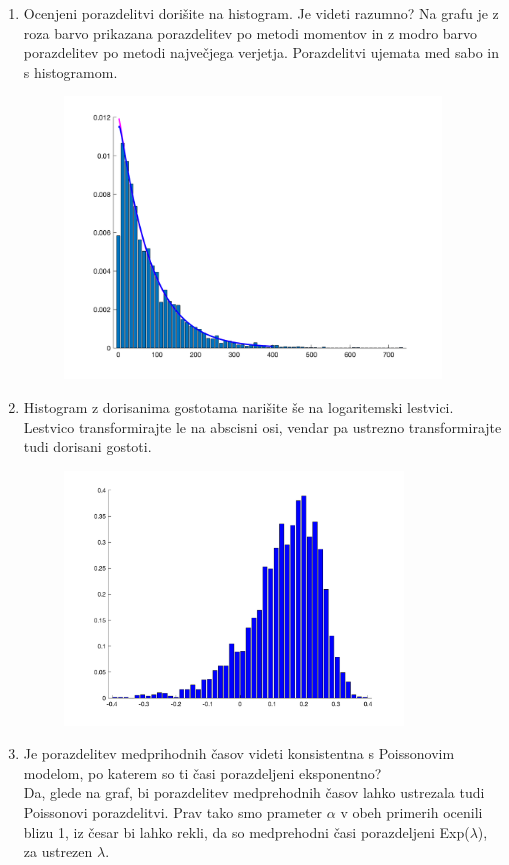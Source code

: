 \documentclass[a4paper]{article}
\begin{document}
\begin{enumerate}[label=(\alph*)]
\item Ocenjeni porazdelitvi dorišite na histogram. Je videti razumno?
Na grafu je z roza barvo prikazana porazdelitev po metodi momentov in z modro barvo porazdelitev po metodi največjega verjetja. Porazdelitvi ujemata med sabo in s histogramom.
\begin{figure}[h!]
\centering
\includegraphics[width=10cm]{histogram_porazdelitve3.png}
\label{Histogram prehodnih časov z ocenjenima porazdelitvama}
\end{figure}

\item Histogram z dorisanima gostotama narišite še na logaritemski lestvici. Lestvico transformirajte le na abscisni osi, vendar pa ustrezno transformirajte tudi dorisani gostoti.

\begin{figure}[h!]
\centering
\includegraphics[width=9cm]{log_histogram3.png}
\label{Histogram prehodnih časov na logaritemski lestvici}
\end{figure}

\item Je porazdelitev medprihodnih časov videti konsistentna s Poissonovim modelom, po katerem so ti časi porazdeljeni eksponentno? \\
Da, glede na graf, bi porazdelitev medprehodnih časov lahko ustrezala tudi Poissonovi porazdelitvi. Prav tako smo prameter $\alpha$ v obeh primerih ocenili blizu 1, iz česar bi lahko rekli, da so medprehodni časi porazdeljeni Exp($\lambda$), za ustrezen $\lambda$.
\end{enumerate}
\end{document}
